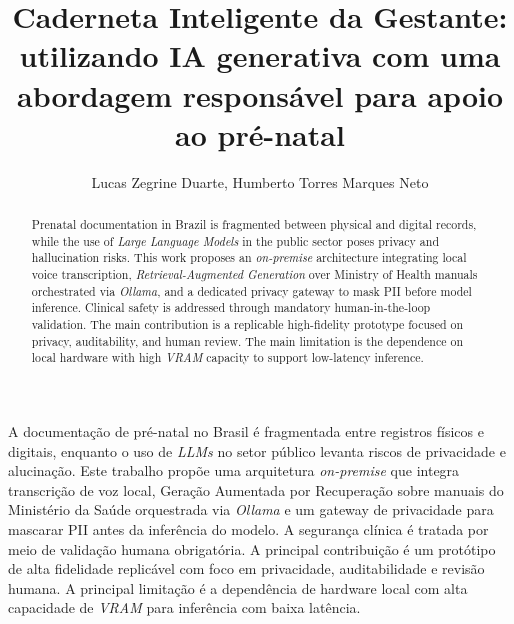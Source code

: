 \documentclass[12pt]{article}
\title{Caderneta Inteligente da Gestante: utilizando IA generativa com uma abordagem responsável para apoio ao
pré-natal}
\author{Lucas Zegrine Duarte\inst{1}, Humberto Torres Marques Neto\inst{1}}
\begin{document}
\maketitle

\begin{abstract}
  Prenatal documentation in Brazil is fragmented between physical and digital records, while the use of \textit{Large Language Models} in the public sector poses privacy and hallucination risks.
  This work proposes an \textit{on-premise} architecture integrating local voice transcription, \textit{Retrieval-Augmented Generation} over Ministry of Health manuals orchestrated via \textit{Ollama}, and a dedicated privacy gateway to mask PII before model inference.
  Clinical safety is addressed through mandatory human-in-the-loop validation.
  The main contribution is a replicable high-fidelity prototype focused on privacy, auditability, and human review.
  The main limitation is the dependence on local hardware with high \textit{VRAM} capacity to support low-latency inference.
\end{abstract}

\begin{resumo}
  A documentação de pré-natal no Brasil é fragmentada entre registros físicos e digitais, enquanto o uso de \textit{LLMs} no setor público levanta riscos de privacidade e alucinação.
  Este trabalho propõe uma arquitetura \textit{on-premise} que integra transcrição de voz local, Geração Aumentada por Recuperação sobre manuais do Ministério da Saúde orquestrada via \textit{Ollama} e um gateway de privacidade para mascarar PII antes da inferência do modelo.
  A segurança clínica é tratada por meio de validação humana obrigatória.
  A principal contribuição é um protótipo de alta fidelidade replicável com foco em privacidade, auditabilidade e revisão humana.
  A principal limitação é a dependência de hardware local com alta capacidade de \textit{VRAM} para inferência com baixa latência.
\end{resumo}
\end{document}
